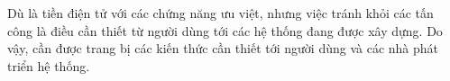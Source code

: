 \documentclass[./../main.tex]{subfiles}
\begin{document}
Dù là tiền điện tử với các chứng năng ưu việt, nhưng việc tránh khỏi các tấn công là điều cần thiết từ người dùng tới các hệ thống đang được xây dựng. Do vậy, cần được trang bị các kiến thức cần thiết tới người dùng và các nhà phát triển hệ thống.
\end{document}
